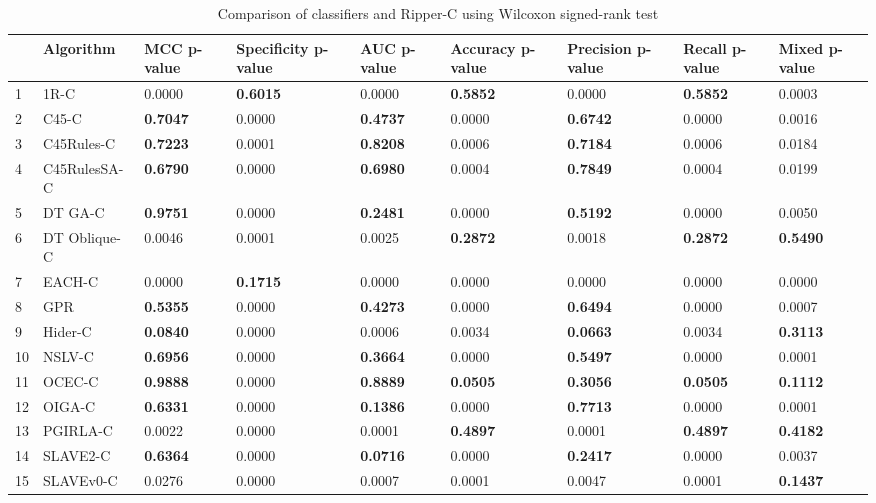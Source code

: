 \begin{table}
\footnotesize
\caption{Comparison of classifiers and Ripper-C using Wilcoxon signed-rank test}
\label{tab:wilcoxon comparison}
\begin{tabular}{lllllllll}
\hline
 & Algorithm & MCC p-value & Specificity p-value & AUC p-value & Accuracy p-value & Precision p-value & Recall p-value & Mixed p-value \\
\hline
1 & 1R-C & 0.0000 & \textbf{0.6015} & 0.0000 & \textbf{0.5852} & 0.0000 & \textbf{0.5852} & 0.0003 \\
2 & C45-C & \textbf{0.7047} & 0.0000 & \textbf{0.4737} & 0.0000 & \textbf{0.6742} & 0.0000 & 0.0016 \\
3 & C45Rules-C & \textbf{0.7223} & 0.0001 & \textbf{0.8208} & 0.0006 & \textbf{0.7184} & 0.0006 & 0.0184 \\
4 & C45RulesSA-C & \textbf{0.6790} & 0.0000 & \textbf{0.6980} & 0.0004 & \textbf{0.7849} & 0.0004 & 0.0199 \\
5 & DT GA-C & \textbf{0.9751} & 0.0000 & \textbf{0.2481} & 0.0000 & \textbf{0.5192} & 0.0000 & 0.0050 \\
6 & DT Oblique-C & 0.0046 & 0.0001 & 0.0025 & \textbf{0.2872} & 0.0018 & \textbf{0.2872} & \textbf{0.5490} \\
7 & EACH-C & 0.0000 & \textbf{0.1715} & 0.0000 & 0.0000 & 0.0000 & 0.0000 & 0.0000 \\
8 & GPR & \textbf{0.5355} & 0.0000 & \textbf{0.4273} & 0.0000 & \textbf{0.6494} & 0.0000 & 0.0007 \\
9 & Hider-C & \textbf{0.0840} & 0.0000 & 0.0006 & 0.0034 & \textbf{0.0663} & 0.0034 & \textbf{0.3113} \\
10 & NSLV-C & \textbf{0.6956} & 0.0000 & \textbf{0.3664} & 0.0000 & \textbf{0.5497} & 0.0000 & 0.0001 \\
11 & OCEC-C & \textbf{0.9888} & 0.0000 & \textbf{0.8889} & \textbf{0.0505} & \textbf{0.3056} & \textbf{0.0505} & \textbf{0.1112} \\
12 & OIGA-C & \textbf{0.6331} & 0.0000 & \textbf{0.1386} & 0.0000 & \textbf{0.7713} & 0.0000 & 0.0001 \\
13 & PGIRLA-C & 0.0022 & 0.0000 & 0.0001 & \textbf{0.4897} & 0.0001 & \textbf{0.4897} & \textbf{0.4182} \\
14 & SLAVE2-C & \textbf{0.6364} & 0.0000 & \textbf{0.0716} & 0.0000 & \textbf{0.2417} & 0.0000 & 0.0037 \\
15 & SLAVEv0-C & 0.0276 & 0.0000 & 0.0007 & 0.0001 & 0.0047 & 0.0001 & \textbf{0.1437} \\
\hline
\end{tabular}
\end{table}
